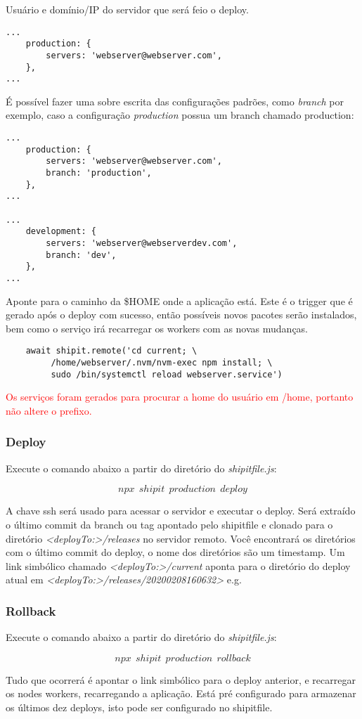Usuário e domínio/IP do servidor que será feio o deploy.
\begin{verbatim}
...
    production: {
        servers: 'webserver@webserver.com',
    },
...
\end{verbatim}

É possível fazer uma sobre escrita das configurações padrões,
como \emph{branch} por exemplo, caso a configuração \emph{production}
possua um branch chamado production:
\begin{verbatim}
...
    production: {
        servers: 'webserver@webserver.com',
        branch: 'production',
    },
...

...
    development: {
        servers: 'webserver@webserverdev.com',
        branch: 'dev',
    },
...
\end{verbatim}

Aponte para o caminho da \$HOME onde a aplicação está. Este é o
trigger que é gerado após o deploy com sucesso, então possíveis novos
pacotes serão instalados, bem como o serviço irá recarregar os workers
com as novas mudanças.

\begin{verbatim}
    await shipit.remote('cd current; \
         /home/webserver/.nvm/nvm-exec npm install; \
         sudo /bin/systemctl reload webserver.service')
\end{verbatim}

\textcolor{red}{Os serviços foram gerados para procurar a home do
  usuário em /home, portanto não altere o prefixo.}

\subsubsection{Deploy}
Execute o comando abaixo a partir do diretório do
\emph{shipitfile.js}:

$$npx\ \ shipit\ \ production\ \ deploy$$

A chave ssh será usado para acessar o servidor e executar o
deploy. Será extraído o último commit da branch ou tag apontado pelo
shipitfile e clonado para o diretório
\textit{<\textit{deployTo:}>/releases} no servidor remoto. Você
encontrará os diretórios com o último commit do deploy, o nome dos
diretórios são um timestamp. Um link simbólico chamado
\textit{<deployTo:>/current} aponta para o diretório do deploy atual
em \textit{<deployTo:>/releases/20200208160632>} e.g. 


\subsubsection{Rollback}
Execute o comando abaixo a partir do diretório do
\emph{shipitfile.js}:

$$npx\ \ shipit\ \ production\ \ rollback$$

Tudo que ocorrerá é apontar o link simbólico para o deploy anterior, e
recarregar os nodes workers, recarregando a aplicação. Está pré
configurado para armazenar os últimos dez deploys, isto pode ser
configurado no shipitfile.


